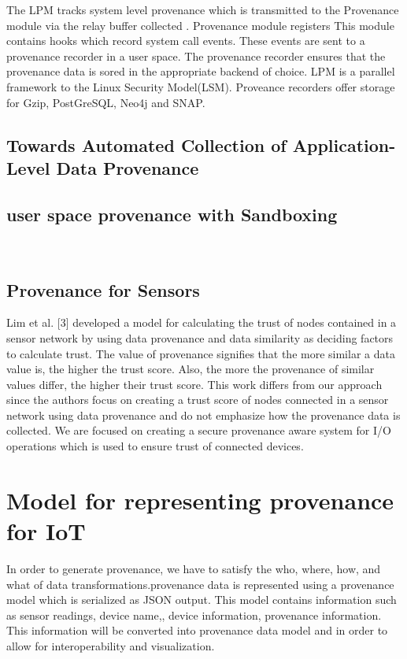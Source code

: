 The LPM tracks system level provenance which is transmitted to the Provenance module via the relay buffer collected . Provenance module registers This module contains hooks which record system call events. These events are sent to a provenance recorder in a user space. The provenance recorder ensures that the provenance data is sored in the appropriate backend of choice. LPM is a parallel framework to the Linux Security Model(LSM). Proveance recorders offer storage for Gzip, PostGreSQL, Neo4j and SNAP.

\subsection{Towards Automated Collection of Application-Level Data Provenance}

\subsection{user space provenance with Sandboxing}
\

\subsection{Provenance for Sensors}
Lim et al. [3] developed a
model for calculating the trust of nodes contained in a sensor network by using data
provenance and data similarity as deciding factors to calculate trust. The value of
provenance signifies that the more similar a data value is, the higher the trust score.
Also, the more the provenance of similar values differ, the higher their trust score.
This work differs from our approach since the authors focus on creating a trust score
of nodes connected in a sensor network using data provenance and do not emphasize
how the provenance data is collected. We are focused on creating a secure
provenance aware system for I/O operations which is used to ensure trust of
connected devices.




\section{Model for representing provenance for IoT}

In order to generate provenance, we have to satisfy the who, where, how, and what of data transformations.provenance data is represented using a provenance model which is serialized as JSON output. This model contains information such as sensor readings, device name,, device information, provenance information. This information will be converted into provenance data model and in order to allow for interoperability and visualization.

